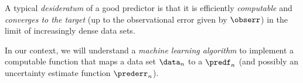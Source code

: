 A typical \textit{desideratum} of a good predictor is that it is efficiently \textit{computable} and \textit{converges to the target} (up to the observational error given by $\obserr$) in the limit of increasingly dense data sets.

%


In our context, we will understand a \textit{machine learning algorithm} to implement a computable function that maps a data set $\data_n $ to a 
 $\predf_n$ (and possibly an uncertainty estimate function $\prederr_n$). 


